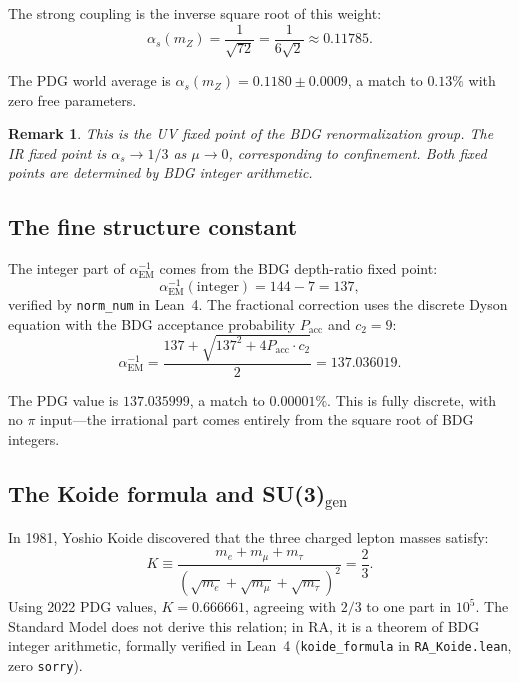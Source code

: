 \documentclass[11pt]{article}
\newtheorem{remark}{Remark}
\begin{document}
The strong coupling is the inverse square root of this weight:
\begin{equation}
\boxed{\alpha_s(m_Z) = \frac{1}{\sqrt{72}} = \frac{1}{6\sqrt{2}} \approx 0.11785.}
\end{equation}

The PDG world average is $\alpha_s(m_Z)=0.1180\pm 0.0009$, a match to $0.13\%$ with zero free parameters.

\begin{remark}
This is the UV fixed point of the BDG renormalization group. The IR fixed point is $\alpha_s\to 1/3$ as $\mu\to 0$, corresponding to confinement. Both fixed points are determined by BDG integer arithmetic.
\end{remark}

\subsection{The fine structure constant}
\label{sec:alpha_em}

The integer part of $\alpha_{\mathrm{EM}}^{-1}$ comes from the BDG depth-ratio fixed point:
\begin{equation}
\alpha_{\mathrm{EM}}^{-1}(\text{integer}) = 144-7 = 137,
\end{equation}
verified by \texttt{norm\_num} in Lean~4. The fractional correction uses the discrete Dyson equation with the BDG acceptance probability $P_{\mathrm{acc}}$ and $c_2=9$:
\begin{equation}
\boxed{\alpha_{\mathrm{EM}}^{-1} = \frac{137+\sqrt{137^2+4P_{\mathrm{acc}}\cdot c_2}}{2} = 137.036019.}
\end{equation}

The PDG value is $137.035999$, a match to $0.00001\%$. This is fully discrete, with no $\pi$ input---the irrational part comes entirely from the square root of BDG integers.

\subsection{The Koide formula and SU(3)\texorpdfstring{$_{\mathrm{gen}}$}{gen}}
\label{sec:koide}

In 1981, Yoshio Koide discovered that the three charged lepton masses satisfy:
\begin{equation}
K \equiv \frac{m_e+m_\mu+m_\tau}{(\sqrt{m_e}+\sqrt{m_\mu}+\sqrt{m_\tau})^2} = \frac{2}{3}.
\end{equation}
Using 2022 PDG values, $K=0.666661$, agreeing with $2/3$ to one part in $10^5$. The Standard Model does not derive this relation; in RA, it is a theorem of BDG integer arithmetic, formally verified in Lean~4 (\texttt{koide\_formula} in \texttt{RA\_Koide.lean}, zero \texttt{sorry}).
\end{document}
